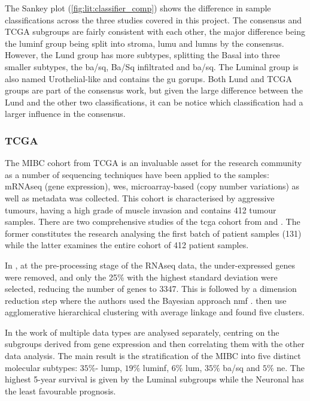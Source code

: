 The Sankey plot (\cref{fig:lit:classifier_comp}) shows the difference in sample classifications across the three studies covered in this project. The consensus and TCGA subgroups are fairly consistent with each other, the major difference being the \acrfull{luminf} group being split into \acrfull{stroma}, \acrfull{lumu} and \acrfull{lumns} by the consensus. However, the Lund group has more subtypes, splitting the Basal into three smaller subtypes, the \acrfull{ba/sq}, Ba/Sq infiltrated and \acrfull{ba/sq}. The Luminal group is also named Urothelial-like and contains the \acrfull{gu} gorups. Both Lund and TCGA groups are part of the consensus work, but given the large difference between the Lund and the other two classifications, it can be notice which classification had a larger influence in the consensus.


\subsubsection*{TCGA} \label{s:lit:tcga_mibc}

The MIBC cohort from TCGA is an invaluable asset for the research community as a number of sequencing techniques have been applied to the samples: mRNAseq (gene expression), \acrfull{wes}, microarray-based (copy number variations) as well as metadata was collected. This cohort is characterised by aggressive tumours, having a high grade of muscle invasion and contains 412 tumour samples. There are two comprehensive studies of the \acrlong{tcga} cohort from \citet{Tcga2014-dr} and \citet{Robertson2017-mg}. The former constitutes the research analysing the first batch of patient samples (131) while the latter examines the entire cohort of 412 patient samples. 

In \citet{Robertson2017-mg}, at the pre-processing stage of the RNAseq data, the under-expressed genes were removed, and only the 25\% with the highest standard deviation were selected, reducing the number of genes to 3347. This is followed by a dimension reduction step where the authors used the Bayesian approach \acrfull{nmf} \citep{Schmidt2009-zh}. \citet{Robertson2017-mg} then use agglomerative hierarchical clustering with average linkage and found five clusters.

In the work of \citet{Robertson2017-mg} multiple data types are analysed separately, centring on the subgroups derived from gene expression and then correlating them with the other data analysis. The main result is the stratification of the MIBC into five distinct molecular subtypes: $35\%$- \acrfull{lump}, $19\%$ \acrfull{luminf}, $6\%$ \acrfull{lum}, $35\%$ \acrfull{ba/sq} and $5\%$ \acrfull{ne}. The highest 5-year survival is given by the Luminal subgroups while the Neuronal has the least favourable prognosis. 

